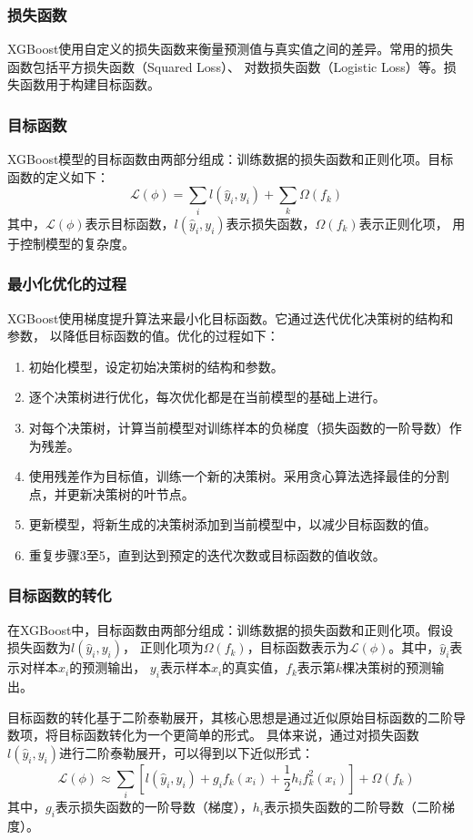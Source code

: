 \documentclass{article}
\begin{document}
\subsubsection{损失函数}
XGBoost使用自定义的损失函数来衡量预测值与真实值之间的差异。常用的损失函数包括平方损失函数（Squared Loss）、
对数损失函数（Logistic Loss）等。损失函数用于构建目标函数。

\subsubsection{目标函数}
XGBoost模型的目标函数由两部分组成：训练数据的损失函数和正则化项。目标函数的定义如下：
\[
\mathcal{L}(\phi) = \sum_{i} l(\hat{y}_i, y_i) + \sum_{k} \Omega(f_k)
\]
其中，$\mathcal{L}(\phi)$表示目标函数，$l(\hat{y}_i, y_i)$表示损失函数，$\Omega(f_k)$表示正则化项，
用于控制模型的复杂度。

\subsubsection{最小化优化的过程}
XGBoost使用梯度提升算法来最小化目标函数。它通过迭代优化决策树的结构和参数，
以降低目标函数的值。优化的过程如下：

\begin{enumerate}
  \item 初始化模型，设定初始决策树的结构和参数。
  \item 逐个决策树进行优化，每次优化都是在当前模型的基础上进行。
  \item 对每个决策树，计算当前模型对训练样本的负梯度（损失函数的一阶导数）作为残差。
  \item 使用残差作为目标值，训练一个新的决策树。采用贪心算法选择最佳的分割点，并更新决策树的叶节点。
  \item 更新模型，将新生成的决策树添加到当前模型中，以减少目标函数的值。
  \item 重复步骤3至5，直到达到预定的迭代次数或目标函数的值收敛。
\end{enumerate}

\subsubsection{目标函数的转化}
在XGBoost中，目标函数由两部分组成：训练数据的损失函数和正则化项。假设损失函数为$l(\hat{y}_i, y_i)$，
正则化项为$\Omega(f_k)$，目标函数表示为$\mathcal{L}(\phi)$。其中，$\hat{y}_i$表示对样本$x_i$的预测输出，
$y_i$表示样本$x_i$的真实值，$f_k$表示第$k$棵决策树的预测输出。

目标函数的转化基于二阶泰勒展开，其核心思想是通过近似原始目标函数的二阶导数项，将目标函数转化为一个更简单的形式。
具体来说，通过对损失函数$l(\hat{y}_i, y_i)$进行二阶泰勒展开，可以得到以下近似形式：
\[
\mathcal{L}(\phi) \approx \sum_{i} \left[ l(\hat{y}_i, y_i) + g_i f_k(x_i) + \frac{1}{2} h_i f_k^2(x_i) \right] + \Omega(f_k)
\]
其中，$g_i$表示损失函数的一阶导数（梯度），$h_i$表示损失函数的二阶导数（二阶梯度）。
\end{document}
